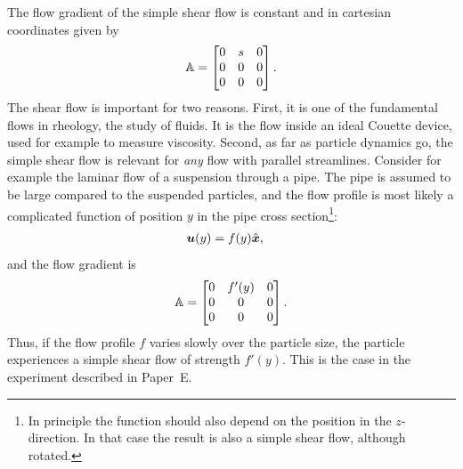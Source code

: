 \documentclass[thesis.tex]{subfiles}
\begin{document}
The flow gradient of the simple shear flow is constant and in cartesian coordinates given by
\begin{align}
	\mathbb{A} = \begin{bmatrix}
		0 & s & 0 \\
		0 & 0 & 0 \\
		0 & 0 & 0 
	\end{bmatrix}.
\end{align}
The shear flow is important for two reasons. First, it is one of the fundamental flows in rheology, the study of fluids. It is the flow inside an ideal Couette device, used for example to measure viscosity. Second, as far as particle dynamics go, the simple shear flow is relevant for \emph{any} flow with parallel streamlines. Consider for example the laminar flow of a suspension through a pipe. The pipe is assumed to be large compared to the suspended particles, and the flow profile is most likely a complicated function of position $y$ in the pipe cross section\footnote{In principle the function should also depend on the position in the $z$-direction. In that case the result is also a simple shear flow, although rotated.}:
\begin{align}
	\mbox{\boldmath$u$}(y) &= f(y)\hat{\mbox{\boldmath$x$}},
\end{align}
 and the flow gradient is
\begin{align}
	\mathbb{A} = \begin{bmatrix}
		0 & f'(y) & 0 \\
		0 & 0 & 0 \\
		0 & 0 & 0 
	\end{bmatrix}.
\end{align}
Thus, if the flow profile $f$ varies slowly over the particle size, the particle experiences a simple shear flow of strength $f'(y)$. This is the case in the experiment described in Paper~E.
\end{document}
